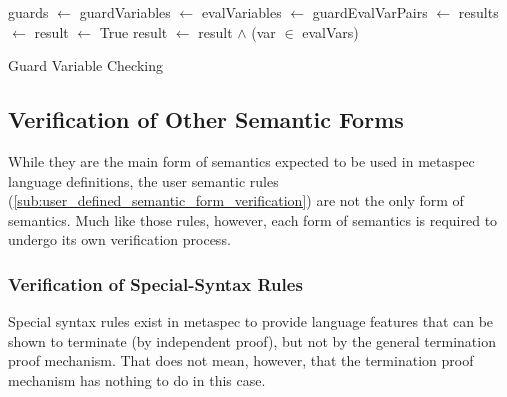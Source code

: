 \begin{algorithm}
\begin{algorithmic}
    \State guards $\gets$ 
    \State guardVariables $\gets$ 
    \State evalVariables $\gets$ 
    \State guardEvalVarPairs $\gets$ 
    \State results $\gets$ 
    \State {}
\EndFunction
\State
{}
    \State result $\gets$ True
        \State result $\gets$ result $\land$ (var $\in$ evalVars)
    \EndFor
        \State {}
    \Else
        \State {}
    \EndIf
\EndFunction
\end{algorithmic}
\caption{Guard Variable Checking}
\label{alg:guard_variable_checking}
\end{algorithm}



\subsection{Verification of Other Semantic Forms} %
\label{sub:verification_of_other_semantic_forms}
While they are the main form of semantics expected to be used in \gls{metaspec} language definitions, the user semantic rules (\autoref{sub:user_defined_semantic_form_verification}) are not the only form of semantics.
Much like those rules, however, each form of semantics is required to undergo its own verification process. 

\subsubsection{Verification of Special-Syntax Rules} %
\label{ssub:verification_of_special_syntax_rules}
Special syntax rules exist in \gls{metaspec} to provide language features that can be shown to terminate (by independent proof), but not by the general termination proof mechanism. 
That does not mean, however, that the termination proof mechanism has nothing to do in this case.\\

